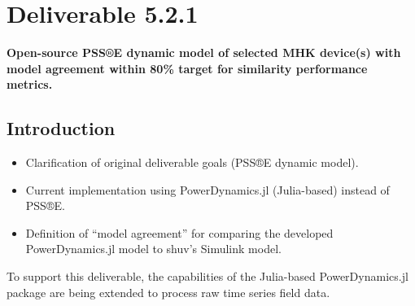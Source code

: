 \documentclass[conference]{IEEEtran}
\begin{document}

\section{Deliverable 5.2.1}

\textbf{Open-source PSS®E dynamic model of selected MHK device(s) with model agreement within 80\% target for similarity performance metrics.}


\subsection{Introduction}
    \begin{itemize}
        \item Clarification of original deliverable goals (PSS®E dynamic model).
        \item Current implementation using PowerDynamics.jl (Julia-based) instead of PSS®E.
        \item Definition of ``model agreement'' for comparing the developed PowerDynamics.jl model to shuv's Simulink model.
    \end{itemize}

    To support this deliverable, the capabilities of the Julia-based PowerDynamics.jl package are being extended to process raw time series field data. 
\end{document}
